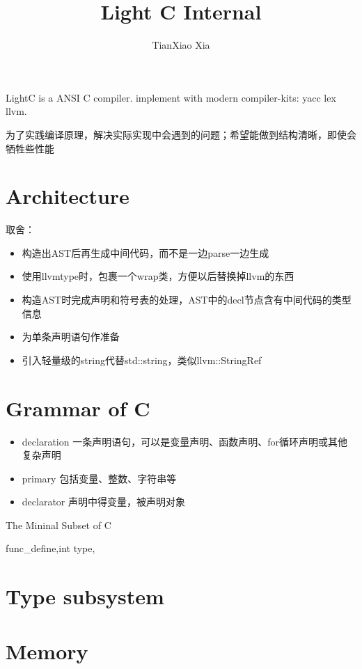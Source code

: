 \documentclass[11pt]{article} %
\title{Light C Internal}
\author{ TianXiao Xia}
\date{} %
\begin{document}
\maketitle
LightC is a ANSI C compiler.  implement with modern compiler-kits: yacc lex llvm. 

为了实践编译原理，解决实际实现中会遇到的问题；希望能做到结构清晰，即使会牺牲些性能

\section{Architecture}


取舍：
\begin{itemize}
\item 构造出AST后再生成中间代码，而不是一边parse一边生成
\item 使用llvmtype时，包裹一个wrap类，方便以后替换掉llvm的东西
\item 构造AST时完成声明和符号表的处理，AST中的decl节点含有中间代码的类型信息
\end{itemize}

\begin{itemize}
\item 为单条声明语句作准备
\end{itemize}

\begin{itemize}
\item 引入轻量级的string代替std::string，类似llvm::StringRef

\end{itemize}
\section{Grammar of C}
\begin{itemize}
\item declaration 一条声明语句，可以是变量声明、函数声明、for循环声明或其他复杂声明
\item primary 包括变量、整数、字符串等
\item declarator 声明中得变量，被声明对象
\end{itemize}

The Mininal Subset of C

func_define,int type,

\section{Type subsystem}
\section{Memory}
\end{document}
